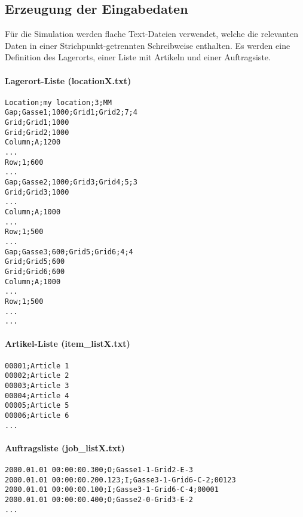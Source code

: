 \subsection{Erzeugung der Eingabedaten}
Für die Simulation werden flache Text-Dateien verwendet, welche die relevanten Daten in einer Strichpunkt-getrennten Schreibweise enthalten. Es werden eine Definition des Lagerorts, einer Liste mit Artikeln und einer Auftragsiste. 
%
\paragraph{Lagerort-Liste (locationX.txt)}
\begin{verbatim}
Location;my location;3;MM
Gap;Gasse1;1000;Grid1;Grid2;7;4
Grid;Grid1;1000
Grid;Grid2;1000
Column;A;1200
...
Row;1;600
...
Gap;Gasse2;1000;Grid3;Grid4;5;3
Grid;Grid3;1000
...
Column;A;1000
...
Row;1;500
...
Gap;Gasse3;600;Grid5;Grid6;4;4
Grid;Grid5;600
Grid;Grid6;600
Column;A;1000
...
Row;1;500
...
...
\end{verbatim}
%
\paragraph{Artikel-Liste (item\_listX.txt)}\label{art-list}
\begin{verbatim}
00001;Article 1
00002;Article 2
00003;Article 3
00004;Article 4
00005;Article 5
00006;Article 6
...
\end{verbatim}
%
\paragraph{Auftragsliste (job\_listX.txt)}
\begin{verbatim}
2000.01.01 00:00:00.300;O;Gasse1-1-Grid2-E-3
2000.01.01 00:00:00.200.123;I;Gasse3-1-Grid6-C-2;00123
2000.01.01 00:00:00.100;I;Gasse3-1-Grid6-C-4;00001
2000.01.01 00:00:00.400;O;Gasse2-0-Grid3-E-2
...
\end{verbatim}
%




